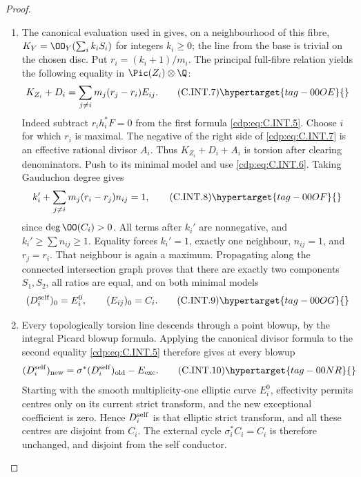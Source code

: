 \begin{proof}
\begin{enumerate}[label=\arabic*.,leftmargin=*]
\item The canonical evaluation used in  gives, on a
neighbourhood of this fibre,
$K_Y=\OO_Y(\sum_i k_iS_i)$ for integers $k_i\ge0$;
the line from the base is trivial on the chosen disc.
Put $r_i=(k_i+1)/m_i$. The principal full-fibre
relation yields the following equality in
$\Pic(Z_i)\otimes\Q$:
\[
 K_{Z_i}+D_i
   =\sum_{j\ne i}m_j(r_j-r_i)E_{ij}.
 \tag{C.INT.7}\hypertarget{tag-00OE}{}\label{cdp:eq:C.INT.7}
\]
Indeed subtract $r_i h_i^*F=0$ from the first
formula \eqref{cdp:eq:C.INT.5}. Choose $i$ for which $r_i$ is
maximal. The negative of the right side of
\eqref{cdp:eq:C.INT.7} is an effective rational divisor $A_i$.
Thus $K_{Z_i}+D_i+A_i$ is torsion after clearing
denominators. Push to its minimal model and use
\eqref{cdp:eq:C.INT.6}. Taking Gauduchon degree gives
\[
 k_i'+\sum_{j\ne i}m_j(r_i-r_j)n_{ij}=1,
 \tag{C.INT.8}\hypertarget{tag-00OF}{}\label{cdp:eq:C.INT.8}
\]
since $\deg\OO(C_i)>0$. All terms after $k_i'$
are nonnegative, and $k_i'\ge\sum n_{ij}\ge1$.
Equality forces $k_i'=1$, exactly one neighbour,
$n_{ij}=1$, and $r_j=r_i$. That neighbour is again
a maximum. Propagating along the connected
intersection graph proves that there are exactly
two components $S_1,S_2$, all ratios are equal,
and on both minimal models
\[
 (D_i^{\rm self})_0=E_i^0,
 \qquad (E_{ij})_0=C_i.
 \tag{C.INT.9}\hypertarget{tag-00OG}{}\label{cdp:eq:C.INT.9}
\]

\item Every topologically
torsion line descends through a point blowup, by the
integral Picard blowup formula. Applying the
canonical divisor formula to the second equality
\eqref{cdp:eq:C.INT.5} therefore gives at every blowup
\[
 (D_i^{\rm self})_{\rm new}
   =\sigma^*(D_i^{\rm self})_{\rm old}-E_{\rm exc}.
 \tag{C.INT.10}\hypertarget{tag-00NR}{}\label{cdp:eq:C.INT.10}
\]
Starting with the smooth multiplicity-one elliptic
curve $E_i^0$, effectivity permits centres only on
its current strict transform, and the new
exceptional coefficient is zero. Hence
$D_i^{\rm self}$ is that elliptic strict transform,
and all these centres are disjoint from $C_i$.
The external cycle $\sigma_i^*C_i=C_i$ is therefore
unchanged, and disjoint from the self conductor.


\end{enumerate}
\end{proof}
